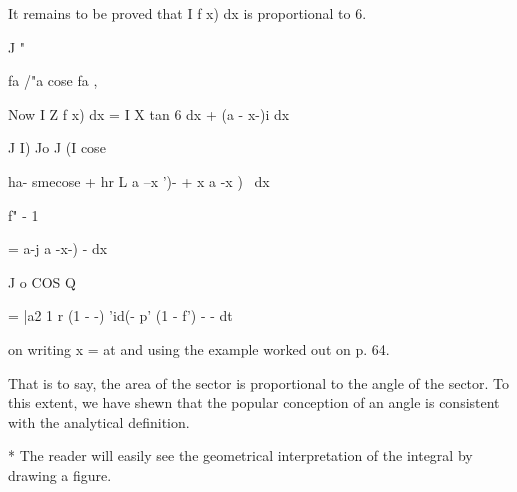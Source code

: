 It remains to be proved that I f x) dx is proportional to 6. 

J " 

fa /"a cose fa , 

Now I Z f x) dx = I X tan 6 dx + (a  - x-)i dx 

J I) Jo J (I cose 

 ha- smecose + hr L a --x ')-  +  x a -x ) \ dx   

f" - 1 

=  a-j  a -x-) - dx 

J o COS Q 

= |a2 1 r (1 -  -) 'id(- p'  (1 - f') - -  dt\ 

on writing x = at and using the example worked out on p. 64. 

That is to say, the area of the sector is proportional to the angle of the sector. To 
this extent, we have shewn that the popular conception of an angle is consistent with 
the analytical definition. 

* The reader will easily see the geometrical interpretation of the integral by drawing a 
figure. 